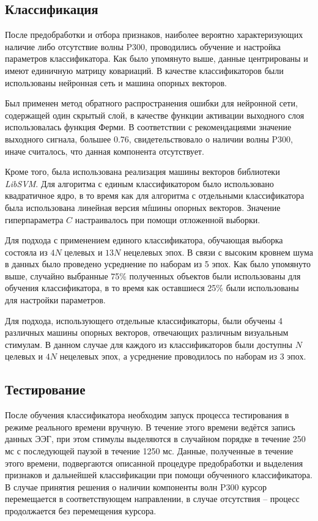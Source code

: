 \documentclass[12pt,a4paper,oneside,fleqn,leqno]{article}
\begin{document}
\subsection{Классификация}
	\par После предобработки и отбора признаков, наиболее вероятно характеризующих наличие либо отсутствие волны P300, проводились обучение и  настройка параметров классификатора. Как было упомянуто выше, данные центрированы и имеют единичную матрицу ковариаций. В качестве классификаторов были использованы нейронная сеть и машина опорных векторов.
	\par Был применен метод обратного распространения ошибки для нейронной сети, содержащей один скрытый слой, в качестве функции активации выходного слоя использовалась функция Ферми. В соответствии с рекомендациями значение выходного сигнала, большее 0.76, свидетельствовало о наличии волны P300, иначе считалось, что данная компонента отсутствует.
	\par Кроме того, была использована реализация машины векторов библиотеки {\it LibSVM}. Для алгоритма с единым классификатором было использовано квадратичное ядро, в то время как для алгоритма с отдельными классификатора была использована линейная версия мfшины опорных векторов. Значение гиперпараметра $C$ настраивалось при помощи отложенной выборки.
	\par Для подхода с применением единого классификатора, обучающая выборка состояла из $4N$ целевых и $13N$ нецелевых эпох. В связи с высоким кровнем шума в данных было проведено усреднение по наборам из 5 эпох. Как было упомянуто выше, случайно выбранные 75\% полученных объектов были использованы для обучения классификатора, в то время как оставшиеся 25\% были использованы для настройки параметров.
	\par Для подхода, использующего отдельные классификаторы, были обучены 4 различных машины опорных векторов, отвечающих различным визуальным стимулам. В данном случае для каждого из классификаторов были доступны $N$ целевых и $4N$ нецелевых эпох, а усреднение проводилось по наборам из 3 эпох.

\subsection{Тестирование}
	\par После обучения классификатора необходим запуск процесса тестирования в режиме реального времени вручную. В течение этого времени ведётся запись данных ЭЭГ, при этом стимулы выделяются в случайном порядке в течение 250 мс с последующей паузой в течение 1250 мс. Данные, полученные в течение этого времени, подвергаются описанной процедуре предобработки и выделения признаков и дальнейшей классификации при помощи обученного классификатора. В случае принятия решения о наличии компоненты волн P300 курсор перемещается в соответствующем направлении, в случае отсутствия -- процесс продолжается без перемещения курсора.
\end{document}
